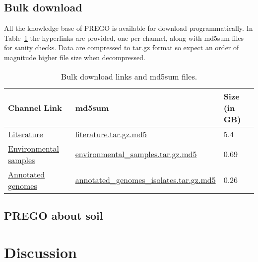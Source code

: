 \subsection{Bulk download}
\label{bulk-download}

All the knowledge base of PREGO is available for download programmatically.
In Table~\ref{table:prego-appD-1} the hyperlinks are provided, one per channel, along with md5sum files for sanity checks.
Data are compressed to tar.gz format so expect an order of magnitude higher file size when decompressed.

   \begin{table}[ht]
      

      \begin{tabular}{lll}
      \toprule
      Channel Link & md5sum & Size (in GB) \\ \midrule

      \href{https://prego.hcmr.gr/download/literature.tar.gz}{Literature} & \href{https://prego.hcmr.gr/download/literature.tar.gz.md5}{literature.tar.gz.md5} & 5.4 \\

      \href{https://prego.hcmr.gr/download/environmental\_samples.tar.gz}{Environmental samples} & 
      \href{https://prego.hcmr.gr/download/environmental\_samples.tar.gz.md5}{environmental\_samples.tar.gz.md5}
      & 0.69 \\

      \href{https://prego.hcmr.gr/download/annotated\_genomes\_isolates.tar.gz}{Annotated genomes} &
      \href{https://prego.hcmr.gr/download/annotated\_genomes\_isolates.tar.gz.md5}{annotated\_genomes\_isolates.tar.gz.md5} & 0.26 \\ \bottomrule
      \end{tabular}
      \caption[PREGO Bulk download.]{Bulk download links and md5sum files.}
      \label{table:prego-appD-1}
   \end{table}



   \subsection{PREGO about soil}
   \label{subsec:prego-soil}




\section{Discussion}
\label{sec:prego-discussion}

